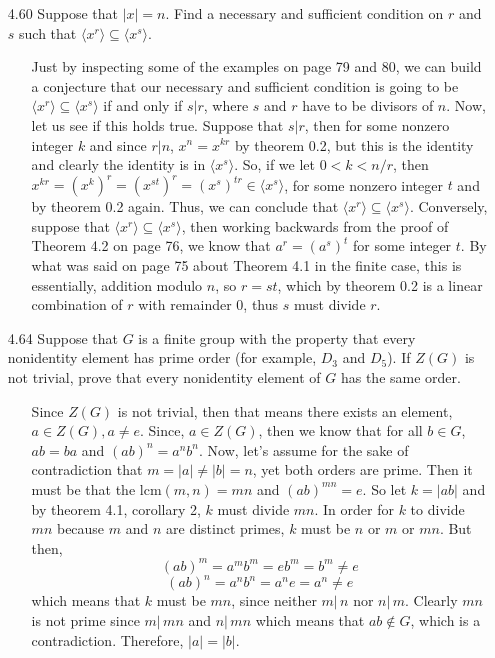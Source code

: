 \documentclass[12pt]{article}
\begin{document}
\begin{enumerate}
\item[4.60] Suppose that $|x| = n$. Find a necessary and sufficient condition on $r$ and
$s$ such that $\langle x^r\rangle \subseteq \langle x^s \rangle$.
\begin{enumerate}
\item[] Just by inspecting some of the examples on page 79 and 80, we can build a conjecture
that our necessary and sufficient condition is going to be $\langle x^r\rangle \subseteq 
\langle x^s\rangle$ if and only if $s|r$, where $s$ and $r$ have to be divisors of $n$. 
Now, let us see if this holds true. Suppose that $s|r$, then for some nonzero integer $k$ and since
$r|n$, $x^n = x^{kr}$ by theorem 0.2, but this is the identity and clearly the identity
is in $\langle x^s\rangle$. So, if we let $0 < k < n/r$, then
$x^{kr} = (x^k)^r = (x^{st})^r = (x^s)^{tr} \in \langle x^s\rangle$, for some nonzero integer $t$ and 
by theorem 0.2 again. Thus, we can conclude that $\langle x^r\rangle \subseteq 
\langle x^s\rangle$. Conversely, suppose that $\langle x^r\rangle \subseteq 
\langle x^s\rangle$, then working backwards from the proof of Theorem 4.2 on page 76, we know that
$a^r = (a^s)^t$ for some integer $t$. By what was said on page 75 about Theorem 4.1 in the
finite case, this is essentially, addition modulo $n$, so $r = st$, which by theorem 0.2 is a 
linear combination of $r$ with remainder 0, thus $s$ must divide $r$.
\end{enumerate}

\item[4.64] Suppose that $G$ is a finite group with the property that every nonidentity
element has prime order (for example, $D_3$ and $D_5$). If $Z(G)$ is not trivial, prove
that every nonidentity element of $G$ has the same order.
\begin{enumerate}
\item[] Since $Z(G)$ is not trivial, then that means there exists an element, $a \in Z(G), a \neq e$.
Since, $a \in Z(G)$, then we know that for all $b \in G$, $ab = ba$ and $(ab)^n = a^nb^n$. Now, let's
assume for the sake of contradiction that $m = |a| \neq |b| = n$, yet both orders are prime. Then 
it must be that the lcm$(m, n) = mn$ and $(ab)^{mn} = e$. So let $k = |ab|$ and by theorem 4.1, 
corollary 2, $k$ must divide $mn$. In order for $k$ to divide $mn$ because $m$ and $n$ are distinct
primes, $k$ must be $n$ or $m$ or $mn$. But then, 
\[
(ab)^m = a^mb^m = eb^m = b^m \neq e \] \[
(ab)^n = a^nb^n = a^ne = a^n \neq e
\]
which means that $k$ must be $mn$, since neither $m |\, n$ nor $n |\, m$. Clearly $mn$ is not prime
since $m | \, mn$ and $n | \, mn$ which means that $ab \not\in G$, which is a contradiction. Therefore,
$|a| = |b|$.
\end{enumerate}


\end{enumerate}
\end{document}
